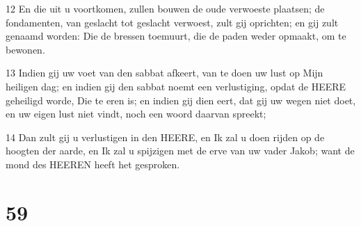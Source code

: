 \par 12 En die uit u voortkomen, zullen bouwen de oude verwoeste plaatsen; de fondamenten, van geslacht tot geslacht verwoest, zult gij oprichten; en gij zult genaamd worden: Die de bressen toemuurt, die de paden weder opmaakt, om te bewonen.
\par 13 Indien gij uw voet van den sabbat afkeert, van te doen uw lust op Mijn heiligen dag; en indien gij den sabbat noemt een verlustiging, opdat de HEERE geheiligd worde, Die te eren is; en indien gij dien eert, dat gij uw wegen niet doet, en uw eigen lust niet vindt, noch een woord daarvan spreekt;
\par 14 Dan zult gij u verlustigen in den HEERE, en Ik zal u doen rijden op de hoogten der aarde, en Ik zal u spijzigen met de erve van uw vader Jakob; want de mond des HEEREN heeft het gesproken.

\chapter{59}


